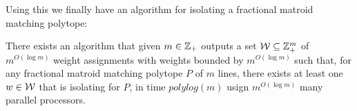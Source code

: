 Using this we finally have an algorithm for isolating a fractional matroid matching polytope:
\begin{Theorem}{\cite[Theorem 3.1]{GurjarOkiRaj_2024_Flm}}{}
	There exists an algorithm that given $m\in \mathbb{Z}_+$ outputs a set $\mathcal{W}\subseteq \mathbb{Z}^m_+$ of $m^{O(\log m)}$ weight assignments with weights bounded by $m^{O(\log m)}$ such that, for any fractional matroid matching polytope $P$ of $m$ lines, there exists at least one $w\in \mathcal{W}$ that is isolating for $P$, in time $polylog(m)$ usign $m^{O(\log m)}$ many parallel processors.
\end{Theorem}
